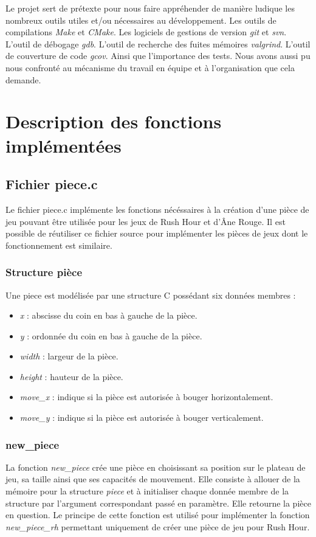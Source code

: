 \documentclass{report}
\begin{document}
Le projet sert de prétexte pour nous faire appréhender de manière ludique les nombreux outils utiles et/ou nécessaires au développement. Les outils de compilations \emph{Make} et \emph{CMake}. Les logiciels de gestions de version \emph{git} et \emph{svn}. L’outil de débogage \emph{gdb}. L’outil de recherche des fuites mémoires \emph{valgrind}. L’outil de couverture de code \emph{gcov}. Ainsi que l’importance des tests. Nous avons aussi pu nous confronté au mécanisme du travail en équipe et à l’organisation que cela demande.
\chapter{Description des fonctions implémentées}
\section{Fichier piece.c}
Le fichier piece.c implémente les fonctions nécéssaires à la création d'une pièce de jeu pouvant être utilisée pour les jeux de Rush Hour et d'Âne Rouge. Il est possible de réutiliser ce fichier source pour implémenter les pièces de jeux dont le fonctionnement est similaire.
\subsection{Structure pièce}
Une piece est modélisée par une structure C possédant six données membres :
\begin{itemize}
\item \emph{x} : abscisse du coin en bas à gauche de la pièce.
\item \emph{y} : ordonnée du coin en bas à gauche de la pièce.
\item \emph{width} : largeur de la pièce.
\item \emph{height} : hauteur de la pièce.
\item \emph{move\_x} : indique si la pièce est autorisée à bouger horizontalement.
\item \emph{move\_y} : indique si la pièce est autorisée à bouger verticalement.
\end{itemize}
\subsection{new\_piece}
La fonction \emph{new\_piece} crée une pièce en choisissant sa position sur le plateau de jeu, sa taille ainsi que ses capacités de mouvement. Elle consiste à allouer de la mémoire pour la structure \emph{piece} et à initialiser chaque donnée membre de la structure par l'argument correspondant passé en paramètre. Elle retourne la pièce en question. Le principe de cette fonction est utilisé pour implémenter la fonction \emph{new\_piece\_rh} permettant uniquement de créer une pièce de jeu pour Rush Hour.
\end{document}
